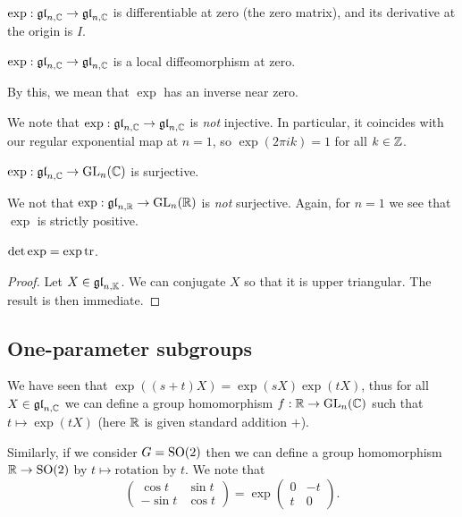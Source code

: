 \begin{proposition}
    $\exp: \gl[n, \C] \to \gl[n, \C]$ is differentiable at zero (the zero matrix), and its derivative at the origin is $I$.
\end{proposition}

\begin{corollary}
    $\exp: \gl[n, \C] \to \gl[n, \C]$ is a local diffeomorphism at zero.
\end{corollary}

By this, we mean that $\exp$ has an inverse near zero.

We note that $\exp: \gl[n, \C] \to \gl[n, \C]$ is \emph{not} injective. In particular, it coincides with our regular exponential map at $n = 1$, so $\exp(2\pi i k) = 1$ for all $k \in \Z$.

\begin{lemma}
    $\exp: \gl[n, \C] \to \GL_n(\C)$ is surjective.
\end{lemma}

We not that $\exp: \gl[n, \R] \to \GL_n(\R)$ is \emph{not} surjective. Again, for $n = 1$ we see that $\exp$ is strictly positive.

\begin{proposition}
    $\det\exp = \exp\tr$.
\end{proposition}

\begin{proof}
    Let $X \in \gl[n, \K]$. We can conjugate $X$ so that it is upper triangular. The result is then immediate.
\end{proof}

\subsection{One-parameter subgroups}

We have seen that $\exp((s+t)X) = \exp(sX)\exp(tX)$, thus for all $X \in \gl[n, \C]$ we can define a group homomorphism $f: \R \to \GL_n(\C)$ such that $t \mapsto \exp(tX)$ (here $\R$ is given standard addition $+$).

Similarly, if we consider $G = \SO(2)$ then we can define a group homomorphism $\R \to \SO(2)$ by  $t \mapsto \text{rotation by $t$}$. We note that
\[
    \begin{pmatrix}
        \cos t  & \sin t \\
        -\sin t & \cos t
    \end{pmatrix}
    = \exp
    \begin{pmatrix}
        0 & -t \\
        t & 0
    \end{pmatrix}.
\]

